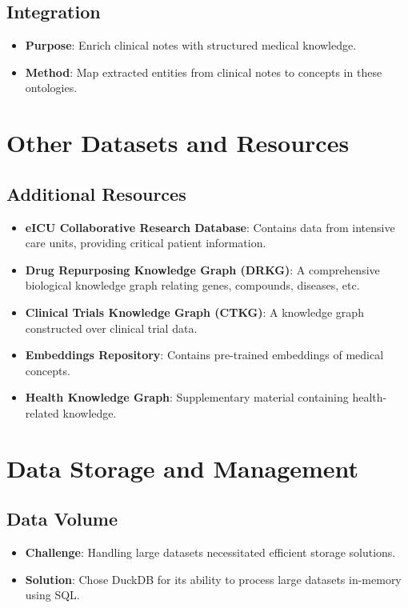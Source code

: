 \documentclass[12pt,a4paper]{report}
\begin{document}
\subsection{Integration}
\begin{itemize}
    \item \textbf{Purpose}: Enrich clinical notes with structured medical knowledge.
    \item \textbf{Method}: Map extracted entities from clinical notes to concepts in these ontologies.
\end{itemize}

\section{Other Datasets and Resources}

\subsection{Additional Resources}
\begin{itemize}
    \item \textbf{eICU Collaborative Research Database}: Contains data from intensive care units, providing critical patient information.
    \item \textbf{Drug Repurposing Knowledge Graph (DRKG)}: A comprehensive biological knowledge graph relating genes, compounds, diseases, etc.
    \item \textbf{Clinical Trials Knowledge Graph (CTKG)}: A knowledge graph constructed over clinical trial data.
    \item \textbf{Embeddings Repository}: Contains pre-trained embeddings of medical concepts.
    \item \textbf{Health Knowledge Graph}: Supplementary material containing health-related knowledge.
\end{itemize}

\section{Data Storage and Management}

\subsection{Data Volume}
\begin{itemize}
    \item \textbf{Challenge}: Handling large datasets necessitated efficient storage solutions.
    \item \textbf{Solution}: Chose DuckDB for its ability to process large datasets in-memory using SQL.
\end{itemize}
\end{document}
